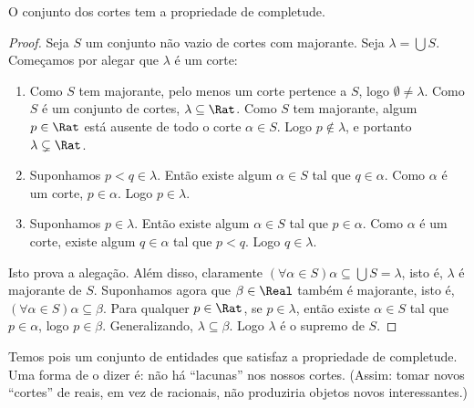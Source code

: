 \documentclass[../../../include/open-logic-section]{subfiles}
\begin{document}
\begin{thm}
O conjunto dos cortes tem a propriedade de completude. 
\end{thm}

\begin{proof}
Seja $S$ um conjunto não vazio de cortes com majorante. Seja $\lambda
= \bigcup S$. 
Começamos por alegar que $\lambda$ é um corte:
\begin{enumerate}
\item Como $S$ tem majorante, pelo menos um corte pertence a $S$, logo
$\emptyset \neq \lambda$. Como $S$ é um conjunto de cortes, $\lambda
\subseteq \Rat$. Como $S$ tem majorante, algum $p \in \Rat$ está ausente de
todo o corte $\alpha \in S$. Logo $p\notin \lambda$, e portanto
$\lambda \subsetneq \Rat$.
\item Suponhamos $p < q \in \lambda$. Então existe algum $\alpha \in S$
tal que $q \in \alpha$. Como $\alpha$ é um corte, $p \in \alpha$. Logo
$p \in \lambda$.
\item Suponhamos $p \in \lambda$. Então existe algum $\alpha \in S$ tal
que $p \in \alpha$. Como $\alpha$ é um corte, existe algum $q \in
\alpha$ tal que $p < q$. Logo $q \in \lambda$. 
\end{enumerate}
Isto prova a alegação. Além disso, claramente $(\forall \alpha \in S)\alpha
\subseteq \bigcup S = \lambda$, isto é, $\lambda$ é majorante de $S$. Suponhamos
agora que $\beta \in \Real$ também é majorante, isto é, $(\forall \alpha \in S)\alpha \subseteq \beta$. Para qualquer $p \in \Rat$, se $p \in \lambda$, então existe $\alpha \in S$ tal que $p \in \alpha$, logo $p \in \beta$. Generalizando, $\lambda \subseteq \beta$. Logo $\lambda$ é o supremo de $S$.
\end{proof}

Temos pois um conjunto de entidades que satisfaz a propriedade de completude. Uma
forma de o dizer é: não há ``lacunas'' nos nossos cortes. (Assim: tomar novos
``cortes'' de reais, em vez de racionais, não produziria objetos novos
interessantes.)
\end{document}

